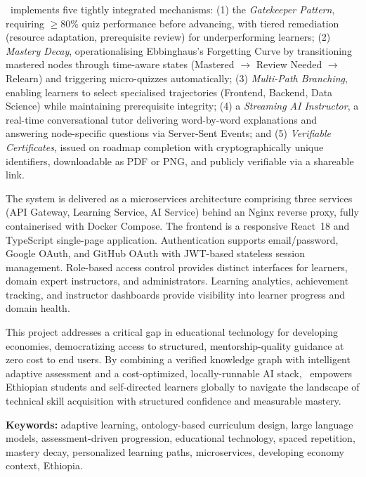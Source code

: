 \documentclass[11pt,a4paper,twoside]{report}
\begin{document}
\projectname\ implements five tightly integrated mechanisms: (1) the \textit{Gatekeeper Pattern}, requiring $\ge$80\% quiz performance before advancing, with tiered remediation (resource adaptation, prerequisite review) for underperforming learners; (2) \textit{Mastery Decay}, operationalising Ebbinghaus's Forgetting Curve by transitioning mastered nodes through time-aware states (Mastered $\to$ Review Needed $\to$ Relearn) and triggering micro-quizzes automatically; (3) \textit{Multi-Path Branching}, enabling learners to select specialised trajectories (Frontend, Backend, Data Science) while maintaining prerequisite integrity; (4) a \textit{Streaming AI Instructor}, a real-time conversational tutor delivering word-by-word explanations and answering node-specific questions via Server-Sent Events; and (5) \textit{Verifiable Certificates}, issued on roadmap completion with cryptographically unique identifiers, downloadable as PDF or PNG, and publicly verifiable via a shareable link.

The system is delivered as a microservices architecture comprising three services (API Gateway, Learning Service, AI Service) behind an Nginx reverse proxy, fully containerised with Docker Compose. The frontend is a responsive React~18 and TypeScript single-page application. Authentication supports email/password, Google OAuth, and GitHub OAuth with JWT-based stateless session management. Role-based access control provides distinct interfaces for learners, domain expert instructors, and administrators. Learning analytics, achievement tracking, and instructor dashboards provide visibility into learner progress and domain health.

This project addresses a critical gap in educational technology for developing economies, democratizing access to structured, mentorship-quality guidance at zero cost to end users. By combining a verified knowledge graph with intelligent adaptive assessment and a cost-optimized, locally-runnable AI stack, \projectname\ empowers Ethiopian students and self-directed learners globally to navigate the landscape of technical skill acquisition with structured confidence and measurable mastery.

\noindent\textbf{Keywords:} adaptive learning, ontology-based curriculum design, large language models, assessment-driven progression, educational technology, spaced repetition, mastery decay, personalized learning paths, microservices, developing economy context, Ethiopia.

\tableofcontents
\newpage
\end{document}
